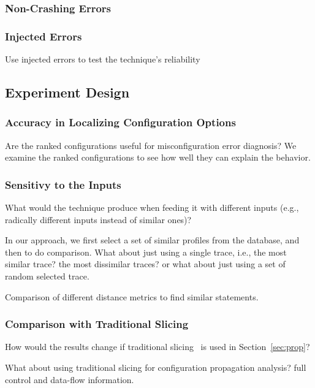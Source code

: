 \subsubsection{Non-Crashing Errors}

\subsubsection{Injected Errors}

Use injected errors to test the technique's reliability

\subsection{Experiment Design}



\subsubsection{Accuracy in Localizing Configuration Options}


Are the ranked configurations useful for misconfiguration error diagnosis?
We examine the ranked configurations to see how well they can explain the behavior.

\subsubsection{Sensitivy to the Inputs}

What would the technique produce when feeding it with different inputs (e.g.,
radically different inputs instead of similar ones)?

In our approach, we first select a set of similar profiles from the  database,
and then to do comparison. What about just using a single trace, i.e., the
most similar trace? the most dissimilar traces? or what about just using a set
of random selected trace.

Comparison of different distance metrics to find similar statements.

\subsubsection{Comparison with Traditional Slicing}

How would the results change if traditional slicing~\cite{Horwitz:1988} is used
in Section~\ref{sec:prop}?

What about using traditional slicing for configuration propagation analysis?
full control and data-flow information.


